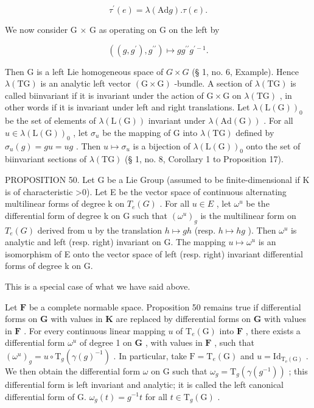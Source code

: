 \[
\tau^ {\prime} (e) = \lambda (\mathrm{Ad} g). \tau (e).\tag{27}
\]

We now consider G × G as operating on G on the left by

\[
\left(\left(g, g ^ {\prime}\right), g ^ {\prime \prime}\right) \mapsto g g ^ {\prime \prime} g ^ {\prime - 1}.
\]

Then G is a left Lie homogeneous space of \(G \times G\) (§ 1, no. 6, Example). Hence \(\lambda(\mathrm{TG})\) is an analytic left vector \((\mathrm{G} \times \mathrm{G})\) -bundle. A section of \(\lambda(\mathrm{TG})\) is called biinvariant if it is invariant under the action of \(\mathrm{G} \times \mathrm{G}\) on \(\lambda(\mathrm{TG})\) , in other words if it is invariant under left and right translations. Let \(\lambda(\mathrm{L}(\mathrm{G}))_{0}\) be the set of elements of \(\lambda(\mathrm{L}(\mathrm{G}))\) invariant under \(\lambda(\mathrm{Ad}(\mathrm{G}))\) . For all \(u \in \lambda(\mathrm{L}(\mathrm{G}))_{0}\) , let \(\sigma_{u}\) be the mapping of G into \(\lambda(\mathrm{TG})\) defined by \(\sigma_{u}(g) = gu = ug\) . Then \(u \mapsto \sigma_{u}\) is a bijection of \(\lambda(\mathrm{L}(\mathrm{G}))_{0}\) onto the set of biinvariant sections of \(\lambda(\mathrm{TG})\) (§ 1, no. 8, Corollary 1 to Proposition 17).

PROPOSITION 50. Let G be a Lie Group (assumed to be finite-dimensional if K is of characteristic \textgreater0). Let E be the vector space of continuous alternating multilinear forms of degree k on \(T_{e}(G)\) . For all \(u \in E\) , let \(\omega^{u}\) be the differential form of degree k on G such that \((\omega^{u})_{g}\) is the multilinear form on \(T_{e}(G)\) derived from u by the translation \(h \mapsto gh\) (resp. \(h \mapsto hg\) ). Then \(\omega^{u}\) is analytic and left (resp. right) invariant on G. The mapping \(u \mapsto \omega^{u}\) is an isomorphism of E onto the vector space of left (resp. right) invariant differential forms of degree k on G.

This is a special case of what we have said above.

Let \(\mathbf{F}\) be a complete normable space. Proposition 50 remains true if differential forms on \(\mathbf{G}\) with values in \(\mathbf{K}\) are replaced by differential forms on \(\mathbf{G}\) with values in \(\mathbf{F}\) . For every continuous linear mapping \(u\) of \(\mathrm{T}_e(\mathrm{G})\) into \(\mathbf{F}\) , there exists a differential form \(\omega^u\) of degree 1 on \(\mathbf{G}\) , with values in \(\mathbf{F}\) , such that \((\omega^{u})_{g} = u \circ \mathrm{T}_{g}(\gamma(g)^{-1})\) . In particular, take \(\mathrm{F} = \mathrm{T}_e(\mathrm{G})\) and \(u = \mathrm{Id}_{\mathrm{T_e(G)}}\) . We then obtain the differential form \(\omega\) on G such that \(\omega_{g} = \mathrm{T}_{g}(\gamma (g^{-1}))\) ; this differential form is left invariant and analytic; it is called the left canonical differential form of G. \(\omega_{g}(t) = g^{-1}t\) for all \(t\in \mathrm{T}_g(\mathrm{G})\) .

